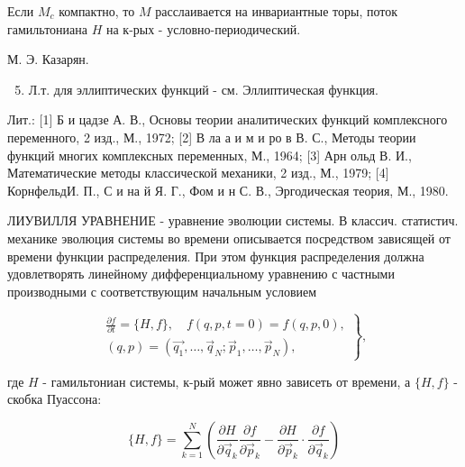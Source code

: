 \documentclass[10pt]{article}
\begin{document}
Если $M_{c}$ компактно, то $M$ расслаивается на инвариантные торы, поток гамильтониана $H$ на к-рых - условно-периодический.



М. Э. Казарян.



\begin{enumerate}

  \setcounter{enumi}{4}

  \item Л.т. для эллиптических функций - см. Эллиптическая функция.

\end{enumerate}



Лит.: [1] Б и цадзе А. В., Основы теории аналитических функций комплексного переменного, 2 изд., М., 1972; [2] В ла а и м и ро в В. С., Методы теории функций многих комплексных переменных, М., 1964; [3] Арн ольд В. И., Математические методы классической механики, 2 изд., М., 1979; [4] КорнфельдИ. П., С и на й Я. Г., Фом и н С. В., Эргодическая теория, М., 1980.



ЛИУВИЛЛЯ УРАВНЕНИЕ - уравнение эволюции системы. В классич. статистич. механике эволюция системы во времени описывается посредством зависящей от времени функции распределения. При этом функция распределения должна удовлетворять линейному дифференциальному уравнению с частными производными с соответствующим начальным условием



\[

\left.\begin{array}{c}

\frac{\partial f}{\partial t}=\{H, f\}, \quad f(q, p, t=0)=f(q, p, 0), \\

(q, p)=\left(\overrightarrow{q_{1}}, \ldots, \vec{q}_{N} ; \vec{p}_{1}, \ldots, \vec{p}_{N}\right),

\end{array}\right\},

\]



где $H$ - гамильтониан системы, к-рый может явно зависеть от времени, а $\{H, f\}$ - скобка Пуассона:



\[

\{H, f\}=\sum_{k=1}^{N}\left(\frac{\partial H}{\partial \vec{q}_{k}} \frac{\partial f}{\partial \vec{p}_{k}}-\frac{\partial H}{\partial \vec{p}_{k}} \cdot \frac{\partial f}{\partial \vec{q}_{k}}\right)

\]
\end{document}
